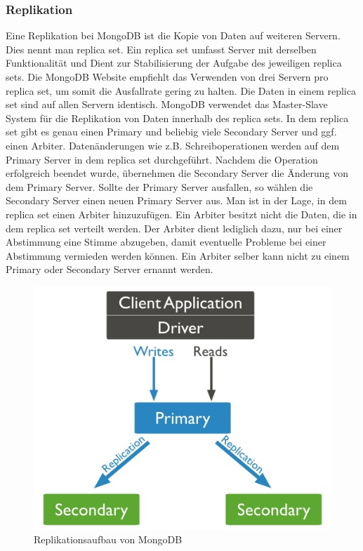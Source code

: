 \subsubsection{Replikation}
Eine Replikation bei MongoDB ist die Kopie von Daten auf weiteren Servern. Dies nennt man replica set. Ein replica set umfasst Server mit derselben Funktionalität und Dient zur Stabilisierung der Aufgabe des jeweiligen replica sets. Die MongoDB Website empfiehlt das Verwenden von drei Servern pro replica set, um somit die Ausfallrate gering zu halten. Die Daten in einem replica set sind auf allen Servern identisch. MongoDB verwendet das Master-Slave System für die Replikation von Daten innerhalb des replica sets. In dem replica set gibt es genau einen Primary und beliebig viele Secondary Server und ggf. einen Arbiter. Datenänderungen wie z.B. Schreiboperationen werden auf dem Primary Server in dem replica set durchgeführt. Nachdem die Operation erfolgreich beendet wurde, übernehmen die Secondary Server die Änderung von dem Primary Server. Sollte der Primary Server ausfallen, so wählen die Secondary Server einen neuen Primary Server aus. Man ist in der Lage, in dem replica set einen Arbiter hinzuzufügen. Ein Arbiter besitzt nicht die Daten, die in dem replica set verteilt werden. Der Arbiter dient lediglich dazu, nur bei einer Abstimmung eine Stimme abzugeben, damit eventuelle Probleme bei einer Abstimmung vermieden werden können. Ein Arbiter selber kann nicht zu einem Primary oder Secondary Server ernannt werden.
\\
\begin{figure}
	\centering
	\includegraphics[scale=1]{images/replica-set-read-write-operations-primary.jpg}  
	\caption{Replikationsaufbau von MongoDB}
\end{figure}
\\
